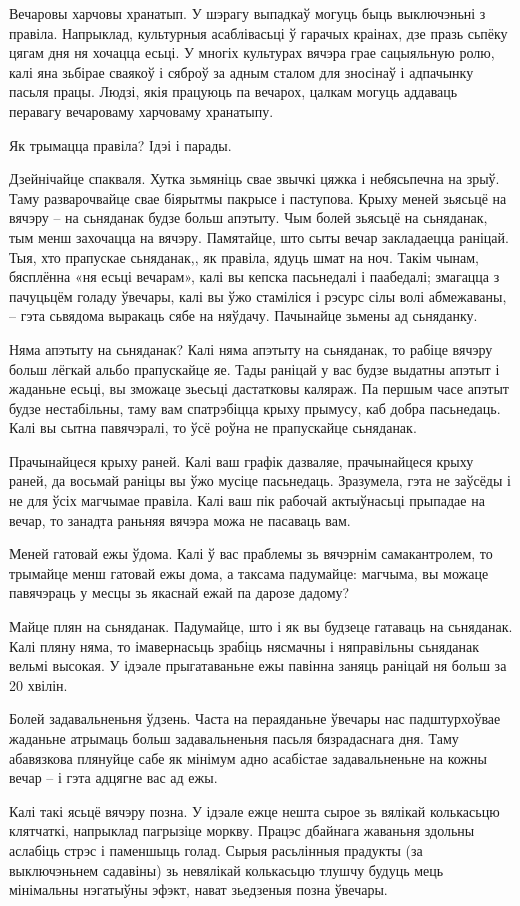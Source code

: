 Вечаровы харчовы хранатып.
У шэрагу выпадкаў могуць быць выключэньні з правіла. Напрыклад, культурныя асаблівасьці ў гарачых краінах, дзе празь сьпёку цягам дня ня хочацца есьці. У многіх культурах вячэра грае сацыяльную ролю, калі яна зьбірае сваякоў і сяброў за адным сталом для зносінаў і адпачынку пасьля працы. Людзі, якія працуюць па вечарох, цалкам могуць аддаваць перавагу вечароваму харчоваму хранатыпу.

Як трымацца правіла? Ідэі і парады.

Дзейнічайце спакваля.
Хутка зьмяніць свае звычкі цяжка і небясьпечна на зрыў. Таму разварочвайце свае біярытмы пакрысе і паступова. Крыху меней зьясьцё на вячэру – на сьняданак будзе больш апэтыту. Чым болей зьясьцё на сьняданак, тым менш захочацца на вячэру. Памятайце, што сыты вечар закладаецца раніцай. Тыя, хто прапускае сьняданак,, як правіла, ядуць шмат на ноч. Такім чынам, бясплённа «ня есьці вечарам», калі вы кепска пасьнедалі і паабедалі; змагацца з пачуцьцём голаду ўвечары, калі вы ўжо стаміліся і рэсурс сілы волі абмежаваны, – гэта сьвядома выракаць сябе на няўдачу. Пачынайце зьмены ад сьняданку.

Няма апэтыту на сьняданак?
Калі няма апэтыту на сьняданак, то рабіце вячэру больш лёгкай альбо прапускайце яе. Тады раніцай у вас будзе выдатны апэтыт і жаданьне есьці, вы зможаце зьесьці дастатковы каляраж. Па першым часе апэтыт будзе нестабільны, таму вам спатрэбіцца крыху прымусу, каб добра пасьнедаць. Калі вы сытна павячэралі, то ўсё роўна не прапускайце сьняданак.

Прачынайцеся крыху раней.
Калі ваш графік дазваляе, прачынайцеся крыху раней, да восьмай раніцы вы ўжо мусіце пасьнедаць. Зразумела, гэта не заўсёды і не для ўсіх магчымае правіла. Калі ваш пік рабочай актыўнасьці прыпадае на вечар, то занадта раньняя вячэра можа не пасаваць вам.

Меней гатовай ежы ўдома.
Калі ў вас праблемы зь вячэрнім самакантролем, то трымайце менш гатовай ежы дома, а таксама падумайце: магчыма, вы можаце павячэраць у месцы зь якаснай ежай па дарозе дадому?

Майце плян на сьняданак.
Падумайце, што і як вы будзеце гатаваць на сьняданак. Калі пляну няма, то імавернасьць зрабіць нясмачны і няправільны сьняданак вельмі высокая. У ідэале прыгатаваньне ежы павінна заняць раніцай ня больш за 20 хвілін.

Болей задавальненьня ўдзень.
Часта на пераяданьне ўвечары нас падштурхоўвае жаданьне атрымаць больш задавальненьня пасьля бязрадаснага дня. Таму абавязкова плянуйце сабе як мінімум адно асабістае задавальненьне на кожны вечар – і гэта адцягне вас ад ежы.

Калі такі ясьцё вячэру позна.
У ідэале ежце нешта сырое зь вялікай колькасьцю клятчаткі, напрыклад пагрызіце моркву. Працэс дбайнага жаваньня здольны аслабіць стрэс і паменшыць голад. Сырыя расьлінныя прадукты (за выключэньнем садавіны) зь невялікай колькасьцю тлушчу будуць мець мінімальны нэгатыўны эфэкт, нават зьедзеныя позна ўвечары.
